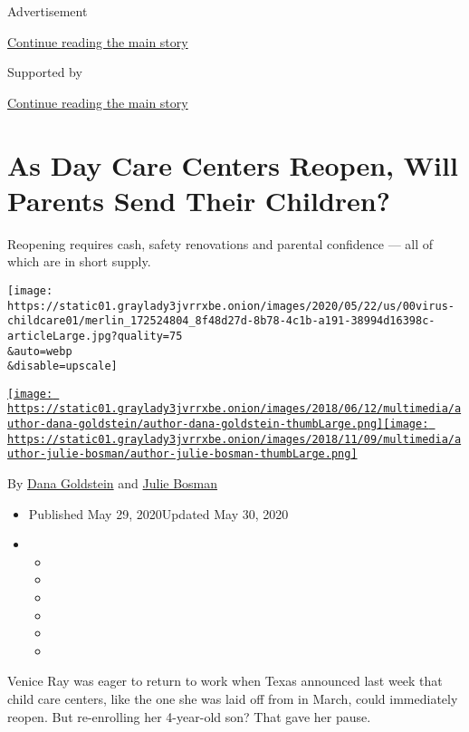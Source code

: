 Advertisement

\protect\hyperlink{after-top}{Continue reading the main story}

Supported by

\protect\hyperlink{after-sponsor}{Continue reading the main story}

\hypertarget{as-day-care-centers-reopen-will-parents-send-their-children}{%
\section{As Day Care Centers Reopen, Will Parents Send Their
Children?}\label{as-day-care-centers-reopen-will-parents-send-their-children}}

Reopening requires cash, safety renovations and parental confidence ---
all of which are in short supply.

\texttt{[image: https://static01.graylady3jvrrxbe.onion/images/2020/05/22/us/00virus-childcare01/merlin\_172524804\_8f48d27d-8b78-4c1b-a191-38994d16398c-articleLarge.jpg?quality=75\\\&auto=webp\\\&disable=upscale]}

\href{https://www.nytimes3xbfgragh.onion/by/dana-goldstein}{\texttt{[image: https://static01.graylady3jvrrxbe.onion/images/2018/06/12/multimedia/author-dana-goldstein/author-dana-goldstein-thumbLarge.png]}}\href{https://www.nytimes3xbfgragh.onion/by/julie-bosman}{\texttt{[image: https://static01.graylady3jvrrxbe.onion/images/2018/11/09/multimedia/author-julie-bosman/author-julie-bosman-thumbLarge.png]}}

By \href{https://www.nytimes3xbfgragh.onion/by/dana-goldstein}{Dana
Goldstein} and
\href{https://www.nytimes3xbfgragh.onion/by/julie-bosman}{Julie Bosman}

\begin{itemize}
\item
  Published May 29, 2020Updated May 30, 2020
\item
  \begin{itemize}
  \item
  \item
  \item
  \item
  \item
  \item
  \end{itemize}
\end{itemize}

Venice Ray was eager to return to work when Texas announced last week
that child care centers, like the one she was laid off from in March,
could immediately reopen. But re-enrolling her 4-year-old son? That gave
her pause.

